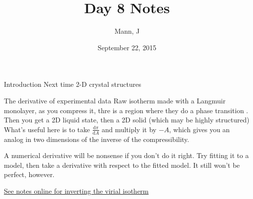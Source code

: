 \documentclass{article}
\author{Mann, J}
\title{Day 8 Notes}
\date{September 22, 2015}
\renewcommand{\d}[0]{\mathrm{d}}
\newcommand{\dOne}[2]{\frac{\d #1}{\d #2}}
\begin{document}
\maketitle
\begin{section}{Introduction}
	\tableofcontents
	Next time 2-D crystal structures
\end{section}
\begin{section}{The derivative of experimental data}
Raw isotherm made with a Langmuir monolayer, as you compress it, thre is a region where they do a phase transition . Then you get a 2D liquid state, then a 2D solid (which may be highly structured)
What's useful here is to take $\dOne{\pi}{A}$ and multiply it by $-A$, which gives you an analog in two dimensions of the inverse of the compressibility.

A numerical derivative will be nonsense if you don't do it right. Try fitting it to a model, then take a derivative with respect to the fitted model. It still won't be perfect, however.
\end{section}
\begin{section}{\href{https://blackboard.case.edu/courses/1/eche464_jam12/content/_1224783_1/processingvirialdata2.pdf}{See notes online for inverting the virial isotherm}}
\end{section}
\end{document}
